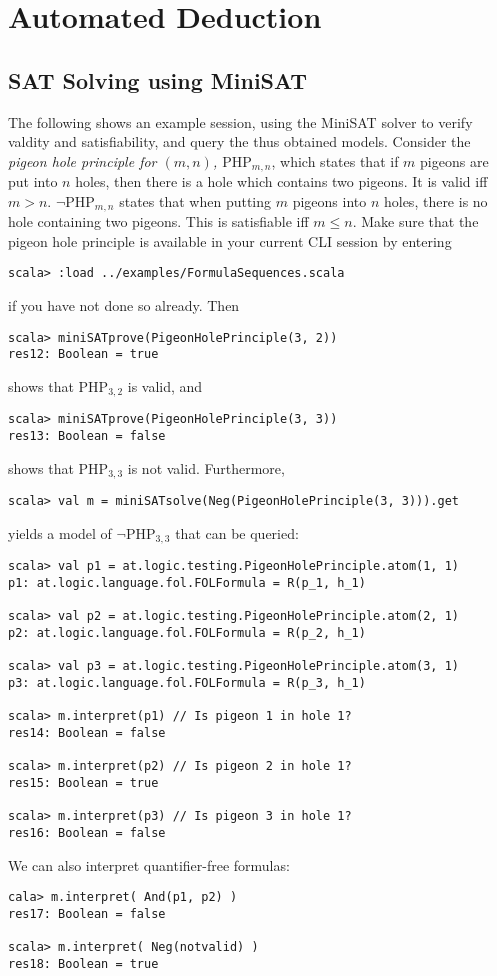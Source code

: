 \documentclass[a4paper,11pt]{article}
\begin{document}
\section{Automated Deduction}
  
\subsection{SAT Solving using MiniSAT}
%
The following shows an example session, using the MiniSAT solver
to verify valdity and satisfiability, and query the thus obtained models.
Consider the {\em pigeon hole principle for $(m, n)$, $\mathrm{PHP}_{m,n}$}, which states that if $m$ pigeons
are put into $n$ holes, then there is a hole which contains two pigeons. It is valid
iff $m>n$. $\neg\mathrm{PHP}_{m,n}$ states that when putting $m$ pigeons into $n$ holes, there
is no hole containing two pigeons. This is satisfiable iff $m\leq n$. Make sure
that the pigeon hole principle is available in your current CLI session 
by entering
\begin{lstlisting}
scala> :load ../examples/FormulaSequences.scala
\end{lstlisting}
if you have not done so already. Then
\begin{lstlisting}
scala> miniSATprove(PigeonHolePrinciple(3, 2))
res12: Boolean = true
\end{lstlisting}
shows that $\mathrm{PHP}_{3,2}$ is valid, and
\begin{lstlisting}
scala> miniSATprove(PigeonHolePrinciple(3, 3))
res13: Boolean = false
\end{lstlisting}
shows that $\mathrm{PHP}_{3,3}$ is not valid.
Furthermore,
\begin{lstlisting}
scala> val m = miniSATsolve(Neg(PigeonHolePrinciple(3, 3))).get
\end{lstlisting}
yields a model of $\neg\mathrm{PHP}_{3,3}$ that can be queried:
\begin{lstlisting}
scala> val p1 = at.logic.testing.PigeonHolePrinciple.atom(1, 1)
p1: at.logic.language.fol.FOLFormula = R(p_1, h_1)

scala> val p2 = at.logic.testing.PigeonHolePrinciple.atom(2, 1)
p2: at.logic.language.fol.FOLFormula = R(p_2, h_1)

scala> val p3 = at.logic.testing.PigeonHolePrinciple.atom(3, 1)
p3: at.logic.language.fol.FOLFormula = R(p_3, h_1)

scala> m.interpret(p1) // Is pigeon 1 in hole 1?
res14: Boolean = false

scala> m.interpret(p2) // Is pigeon 2 in hole 1?
res15: Boolean = true

scala> m.interpret(p3) // Is pigeon 3 in hole 1?
res16: Boolean = false
\end{lstlisting}
We can also interpret quantifier-free formulas:
\begin{lstlisting}
cala> m.interpret( And(p1, p2) )
res17: Boolean = false

scala> m.interpret( Neg(notvalid) )
res18: Boolean = true
\end{lstlisting}
\end{document}
